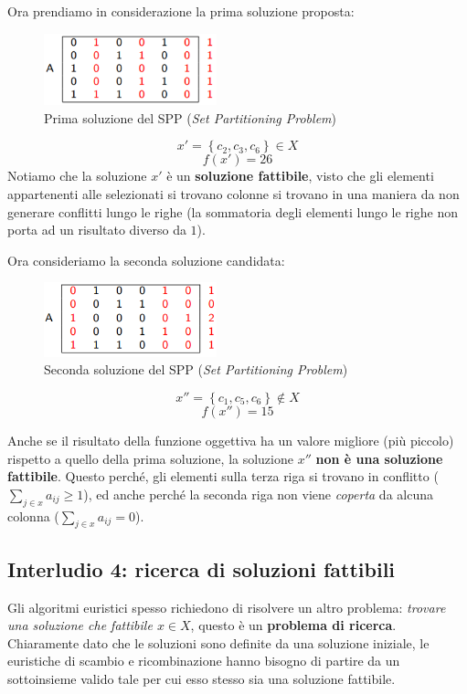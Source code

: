 \documentclass{article}
\begin{document}
Ora prendiamo in considerazione la prima soluzione proposta:

\begin{figure}[H]
    \centering
    \includegraphics[width=5cm]{images/SPP2_fst_sol.png}
    \caption{Prima soluzione del SPP (\textit{Set Partitioning Problem})}
    \label{fig:fst_sol_SPP2}
\end{figure}

$$x'=\left\{c_2,c_3,c_6\right\}\in X$$
$$f(x')=26$$
Notiamo che la soluzione $x'$ è un \textbf{soluzione fattibile}, visto che gli elementi appartenenti alle
selezionati si trovano colonne si trovano in una maniera da non generare conflitti lungo le righe (la sommatoria
degli elementi lungo le righe non porta ad un risultato diverso da $1$).

Ora consideriamo la seconda soluzione candidata:
\begin{figure}[H]
    \centering
    \includegraphics[width=5cm]{images/SPP2_snd_sol.png}
    \caption{Seconda soluzione del SPP (\textit{Set Partitioning Problem})}
    \label{fig:snd_sol_SPP2}
\end{figure}

$$x''=\left\{c_1,c_5,c_6\right\}\notin X$$
$$f(x'')=15$$

Anche se il risultato della funzione oggettiva ha un valore migliore (più piccolo) rispetto a quello della
prima soluzione, la soluzione $x''$ \textbf{non è una soluzione fattibile}. Questo perché, gli elementi sulla terza
riga si trovano in conflitto ($\sum_{j\in x}a_{ij}\geq 1$), ed anche perché la seconda riga non viene \textit{coperta}
da alcuna colonna ($\sum_{j\in x}a_{ij}=0$).

\subsection{Interludio 4: ricerca di soluzioni fattibili}
Gli algoritmi euristici spesso richiedono di risolvere un altro problema: \textit{trovare una soluzione
    che fattibile $x\in X$}, questo è un \textbf{problema di ricerca}. Chiaramente dato che le soluzioni
sono definite da una soluzione iniziale, le euristiche di scambio e ricombinazione hanno bisogno di
partire da un sottoinsieme valido tale per cui esso stesso sia una soluzione fattibile.
\end{document}
